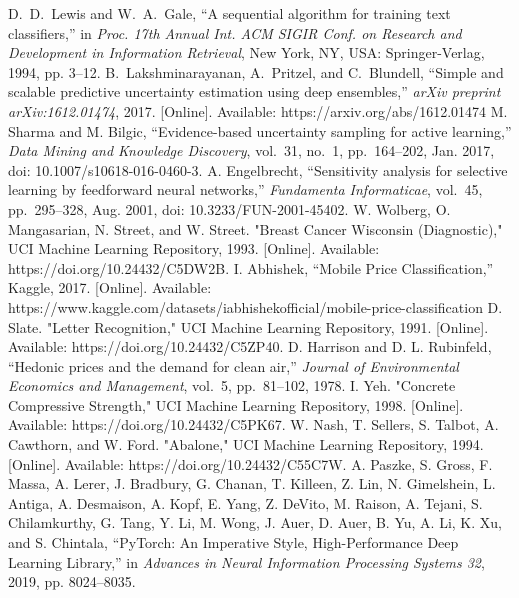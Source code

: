 \documentclass[conference]{IEEEtran}
\begin{document}
	
	\begin{thebibliography}{00}
		 D.~D.~Lewis and W.~A.~Gale, ``A sequential algorithm for training text classifiers,'' in \emph{Proc. 17th Annual Int. ACM SIGIR Conf. on Research and Development in Information Retrieval}, New York, NY, USA: Springer-Verlag, 1994, pp. 3--12.
		 B.~Lakshminarayanan, A.~Pritzel, and C.~Blundell, ``Simple and scalable predictive uncertainty estimation using deep ensembles,'' \emph{arXiv preprint arXiv:1612.01474}, 2017. [Online]. Available: https://arxiv.org/abs/1612.01474
		 M. Sharma and M. Bilgic, ``Evidence-based uncertainty sampling for active learning,'' \emph{Data Mining and Knowledge Discovery}, vol.~31, no.~1, pp.~164--202, Jan. 2017, doi: 10.1007/s10618-016-0460-3.
		 A. Engelbrecht, ``Sensitivity analysis for selective learning by feedforward neural networks,'' \emph{Fundamenta Informaticae}, vol.~45, pp.~295--328, Aug. 2001, doi: 10.3233/FUN-2001-45402.
		 W. Wolberg, O. Mangasarian, N. Street, and W. Street. "Breast Cancer Wisconsin (Diagnostic)," UCI Machine Learning Repository, 1993. [Online]. Available: https://doi.org/10.24432/C5DW2B.
		 I. Abhishek, ``Mobile Price Classification,'' Kaggle, 2017. [Online]. Available: https://www.kaggle.com/datasets/iabhishekofficial/mobile-price-classification
		 D. Slate. "Letter Recognition," UCI Machine Learning Repository, 1991. [Online]. Available: https://doi.org/10.24432/C5ZP40.
		 D. Harrison and D. L. Rubinfeld, ``Hedonic prices and the demand for clean air,'' \emph{Journal of Environmental Economics and Management}, vol.~5, pp.~81--102, 1978.
		 I. Yeh. "Concrete Compressive Strength," UCI Machine Learning Repository, 1998. [Online]. Available: https://doi.org/10.24432/C5PK67.
		 W. Nash, T. Sellers, S. Talbot, A. Cawthorn, and W. Ford. "Abalone," UCI Machine Learning Repository, 1994. [Online]. Available: https://doi.org/10.24432/C55C7W.
			A. Paszke, S. Gross, F. Massa, A. Lerer, J. Bradbury, G. Chanan, T. Killeen, Z. Lin, N. Gimelshein, L. Antiga, A. Desmaison, A. Kopf, E. Yang, Z. DeVito, M. Raison, A. Tejani, S. Chilamkurthy, G. Tang, Y. Li, M. Wong, J. Auer, D. Auer, B. Yu, A. Li, K. Xu, and S. Chintala, ``PyTorch: An Imperative Style, High-Performance Deep Learning Library,'' in \textit{Advances in Neural Information Processing Systems 32}, 2019, pp. 8024--8035.
	\end{thebibliography}
	
\end{document}
